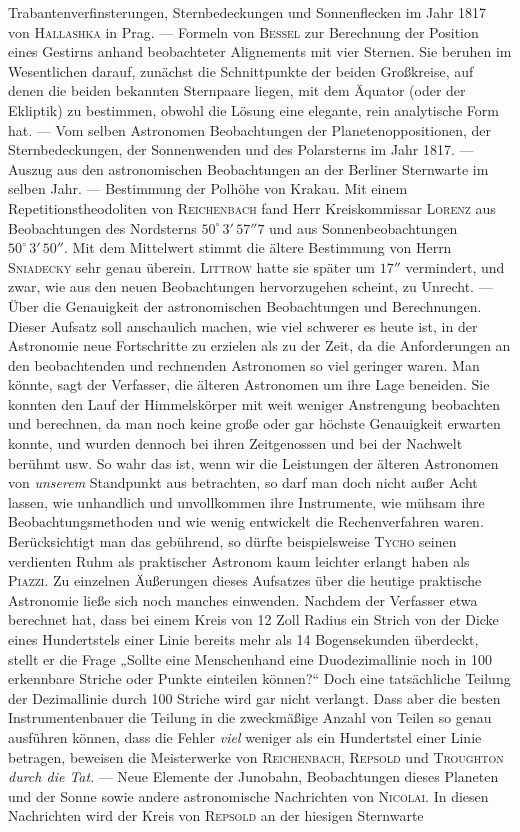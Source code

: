 Trabantenverfinsterungen, Sternbedeckungen und Sonnenflecken im Jahr 1817 von \textsc{Hallashka} in Prag. --- Formeln von \textsc{Bessel} zur Berechnung der Position eines Gestirns anhand beobachteter Alignements mit vier Sternen. Sie beruhen im Wesentlichen darauf, zunächst die Schnittpunkte der beiden Großkreise, auf denen die beiden bekannten Sternpaare liegen, mit dem Äquator (oder der Ekliptik) zu bestimmen, obwohl die Lösung eine elegante, rein analytische Form hat. --- Vom selben Astronomen Beobachtungen der Planetenoppositionen, der Sternbedeckungen, der Sonnenwenden und des Polarsterns im Jahr 1817. --- Auszug aus den astronomischen Beobachtungen an der Berliner Sternwarte im selben Jahr. --- Bestimmung der Polhöhe von Krakau. Mit einem Repetitionstheodoliten von \textsc{Reichenbach} fand Herr Kreiskommissar \textsc{Lorenz} aus Beobachtungen des Nordsterns $50^\circ\,3'\,57''7$ und aus Sonnenbeobachtungen $50^\circ\,3'\,50''$. Mit dem Mittelwert stimmt die ältere Bestimmung von Herrn \textsc{Sniadecky} sehr genau überein. \textsc{Littrow} hatte sie später um $17''$ vermindert, und zwar, wie aus den neuen Beobachtungen hervorzugehen scheint, zu Unrecht. --- Über die Genauigkeit der astronomischen Beobachtungen und Berechnungen. Dieser Aufsatz soll anschaulich machen, wie viel schwerer es heute ist, in der Astronomie neue Fortschritte zu erzielen als zu der Zeit, da die Anforderungen an den beobachtenden und rechnenden Astronomen so viel geringer waren. Man könnte, sagt der Verfasser, die älteren Astronomen um ihre Lage beneiden. Sie konnten den Lauf der Himmelskörper mit weit weniger Anstrengung beobachten und berechnen, da man noch keine große oder gar höchste Genauigkeit erwarten konnte, und wurden dennoch bei ihren Zeitgenossen und bei der Nachwelt berühmt usw. So wahr das ist, wenn wir die Leistungen der älteren Astronomen von \emph{unserem} Standpunkt aus betrachten, so darf man doch nicht außer Acht lassen, wie unhandlich und unvollkommen ihre Instrumente, wie mühsam ihre Beobachtungsmethoden und wie wenig entwickelt die Rechenverfahren waren. Berücksichtigt man das gebührend, so dürfte beispielsweise \textsc{Tycho} seinen verdienten Ruhm als praktischer Astronom kaum leichter erlangt haben als \textsc{Piazzi}. Zu einzelnen Äußerungen dieses Aufsatzes über die heutige praktische Astronomie ließe sich noch manches einwenden. Nachdem der Verfasser etwa berechnet hat, dass bei einem Kreis von 12 Zoll Radius ein Strich von der Dicke eines Hundertstels einer Linie bereits mehr als 14 Bogensekunden überdeckt, stellt er die Frage „Sollte eine Menschenhand eine Duodezimallinie noch in 100 erkennbare Striche oder Punkte einteilen können?“ Doch eine tatsächliche Teilung der Dezimallinie durch 100 Striche wird gar nicht verlangt. Dass aber die besten Instrumentenbauer die Teilung in die zweckmäßige Anzahl von Teilen so genau ausführen können, dass die Fehler \emph{viel} weniger als ein Hundertstel einer Linie betragen, beweisen die Meisterwerke von \textsc{Reichenbach}, \textsc{Repsold} und \textsc{Troughton} \emph{durch die Tat}. --- Neue Elemente der Junobahn, Beobachtungen dieses Planeten und der Sonne sowie andere astronomische Nachrichten von \textsc{Nicolai}. In diesen Nachrichten wird der Kreis von \textsc{Repsold} an der hiesigen Sternwarte 